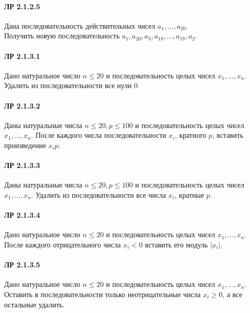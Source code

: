 \documentclass[12pt,a4paper]{report}
\begin{document}
\paragraph*{ЛР 2.1.2.5} Дана последовательность действительных чисел $a_1, ..., a_{20}$. \\
Получить новую последовательность  $a_1, a_{20}, a_3, a_{18}, ..., a_{19}, a_2$.

\clearpage
\paragraph*{ЛР 2.1.3.1} Дано натуральное число $n \le 20$ и последовательность целых чисел $x_1, ..., x_n$. Удалить из последовательности все нули $0$.
\paragraph*{ЛР 2.1.3.2} Даны натуральные числа $n \le 20, p \le 100$ и последовательность целых чисел $x_1, ..., x_n$. После каждого  числа последовательности $x_i$, кратного $p$, вставить произведение $x_i p$.
\paragraph*{ЛР 2.1.3.3} Даны натуральные числа $n \le 20, p \le 100$ и последовательность целых чисел $x_1, ..., x_n$. Удалить из последовательности все числа $x_i$, кратные $p$.
\paragraph*{ЛР 2.1.3.4} Дано натуральное число $n \le 20$ и последовательность целых чисел $x_1, ..., x_n$. После каждого отрицательного числа $x_i<0$ вставить его модуль $|x_i|$.
\paragraph*{ЛР 2.1.3.5} Дано натуральное число $n \le 20$ и последовательность целых чисел $x_1, ..., x_n$. Оставить в последовательности только неотрицательные числа $x_i \ge 0$, а все остальные удалить.


\clearpage
\end{document}
